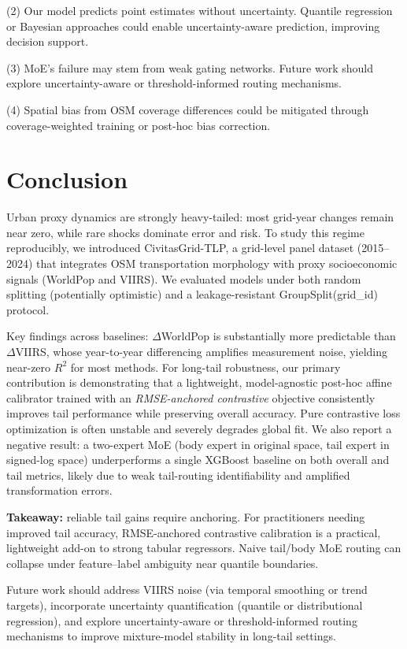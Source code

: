 \documentclass[11pt,conference,onecolumn]{IEEEtran}
\begin{document}
(2) Our model predicts point estimates without uncertainty. Quantile regression or Bayesian approaches could enable uncertainty-aware prediction, improving decision support.

(3) MoE's failure may stem from weak gating networks. Future work should explore uncertainty-aware or threshold-informed routing mechanisms.

(4) Spatial bias from OSM coverage differences could be mitigated through coverage-weighted training or post-hoc bias correction.

\section{Conclusion}

Urban proxy dynamics are strongly heavy-tailed: most grid-year changes remain near zero, while rare shocks dominate error and risk. To study this regime reproducibly, we introduced CivitasGrid-TLP, a grid-level panel dataset (2015–2024) that integrates OSM transportation morphology with proxy socioeconomic signals (WorldPop and VIIRS). We evaluated models under both random splitting (potentially optimistic) and a leakage-resistant GroupSplit(grid\_id) protocol.

Key findings across baselines: $\Delta$WorldPop is substantially more predictable than $\Delta$VIIRS, whose year-to-year differencing amplifies measurement noise, yielding near-zero $R^2$ for most methods. For long-tail robustness, our primary contribution is demonstrating that a lightweight, model-agnostic post-hoc affine calibrator trained with an \emph{RMSE-anchored contrastive} objective consistently improves tail performance while preserving overall accuracy. Pure contrastive loss optimization is often unstable and severely degrades global fit. We also report a negative result: a two-expert MoE (body expert in original space, tail expert in signed-log space) underperforms a single XGBoost baseline on both overall and tail metrics, likely due to weak tail-routing identifiability and amplified transformation errors.

\textbf{Takeaway:} reliable tail gains require anchoring. For practitioners needing improved tail accuracy, RMSE-anchored contrastive calibration is a practical, lightweight add-on to strong tabular regressors. Naive tail/body MoE routing can collapse under feature–label ambiguity near quantile boundaries.

Future work should address VIIRS noise (via temporal smoothing or trend targets), incorporate uncertainty quantification (quantile or distributional regression), and explore uncertainty-aware or threshold-informed routing mechanisms to improve mixture-model stability in long-tail settings.
\end{document}
